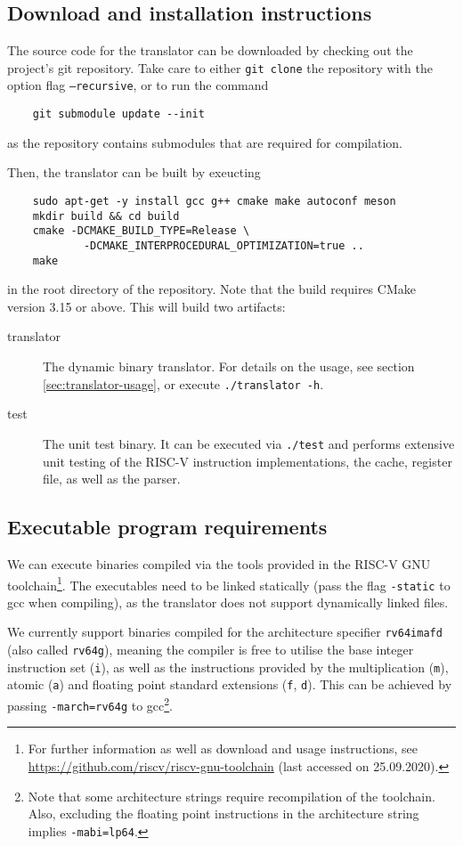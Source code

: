 \subsection{Download and installation instructions}
The source code for the translator can be downloaded by checking out the project's git repository.
Take care to either \texttt{git clone} the repository with the option flag \texttt{--recursive}, or to run the command
\begin{lstlisting}
	git submodule update --init
\end{lstlisting}
as the repository contains submodules that are required for compilation.

Then, the translator can be built by exeucting
\begin{lstlisting}
	sudo apt-get -y install gcc g++ cmake make autoconf meson
	mkdir build && cd build
	cmake -DCMAKE_BUILD_TYPE=Release \
			-DCMAKE_INTERPROCEDURAL_OPTIMIZATION=true ..
	make
\end{lstlisting}
in the root directory of the repository.
Note that the build requires CMake version 3.15 or above.
This will build two artifacts:
\begin{description}
	\item[translator] The dynamic binary translator.
	For details on the usage, see section \ref{sec:translator-usage}, or execute \texttt{./translator -h}.
	
	\item[test] The unit test binary.
	It can be executed via \texttt{./test} and performs extensive unit testing of the RISC-V instruction implementations, the cache, register file, as well as the parser.
\end{description}

\subsection{Executable program requirements}
We can execute binaries compiled via the tools provided in the RISC-V GNU toolchain\footnote{For further information as well as download and usage instructions, see \url{https://github.com/riscv/riscv-gnu-toolchain} (last accessed on 25.09.2020).}.
The executables need to be linked statically (pass the flag \texttt{-static} to gcc when compiling), as the translator does not support dynamically linked files.

We currently support binaries compiled for the architecture specifier \texttt{rv64imafd} (also called \texttt{rv64g}), meaning the compiler is free to utilise the base integer instruction set (\texttt{i}), as well as the instructions provided by the multiplication (\texttt{m}), atomic (\texttt{a}) and floating point standard extensions (\texttt{f}, \texttt{d}).
This can be achieved by passing \texttt{-march=rv64g} to gcc\footnote{Note that some architecture strings require recompilation of the toolchain. Also, excluding the floating point instructions in the architecture string implies \texttt{-mabi=lp64}.}.


